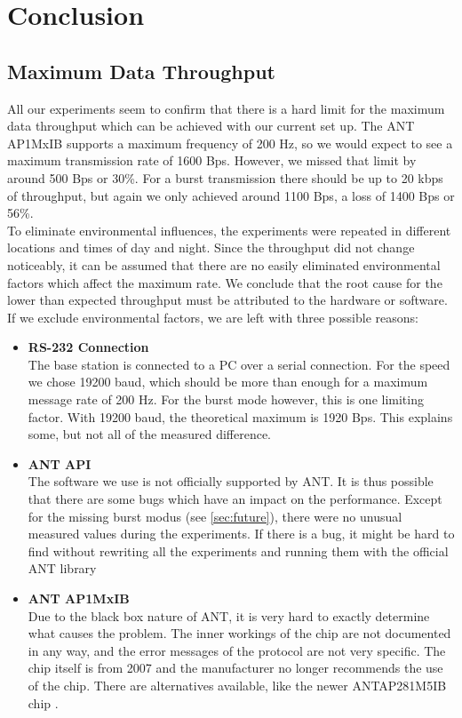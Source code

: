 \chapter{Conclusion}

\section{Maximum Data Throughput}
\label{sec:dataThrougput}

All our experiments seem to confirm that there is a hard limit for the maximum data throughput which can be achieved with our current set up. The ANT AP1MxIB supports a maximum frequency of 200 Hz, so we would expect to see a maximum transmission rate of 1600 Bps. However, we missed that limit by around 500 Bps or 30\%. For a burst transmission there should be up to 20 kbps of throughput, but again we only achieved around 1100 Bps, a loss of 1400 Bps or 56\%.\\
To eliminate environmental influences, the experiments were repeated in different locations and times of day and night. Since the throughput did not change noticeably, it can be assumed that there are no easily eliminated environmental factors which affect the maximum rate. We conclude that the root cause for the lower than expected throughput must be attributed to the hardware or software. \\

If we exclude environmental factors, we are left with three possible reasons:
\begin{itemize}
	\item{\textbf{RS-232 Connection}} \hfill \\ The base station is connected to a PC over a serial connection. For the speed we chose 19200 baud, which should be more than enough for a maximum message rate of 200 Hz. For the burst mode however, this is one limiting factor. With 19200 baud, the theoretical maximum is 1920 Bps. This explains some, but not all of the measured difference.
	
	\item{\textbf{ANT API}} \hfill \\ The software we use is not officially supported by ANT. It is thus possible that there are some bugs which have an impact on the performance. Except for the missing burst modus (see \ref{sec:future}), there were no unusual measured values during the experiments. If there is a bug, it might be hard to find without rewriting all the experiments and running them with the official ANT library \cite{ANTWinLib}
	
	\item{\textbf{ANT AP1MxIB}} \hfill \\ Due to the black box nature of ANT, it is very hard to exactly determine what causes the problem. The inner workings of the chip are not documented in any way, and the error messages of the protocol are not very specific. The chip itself is from 2007 and the manufacturer no longer recommends the use of the chip\cite{AP1page}. There are alternatives available, like the newer ANTAP281M5IB chip \cite{AP2Datasheet}.
\end{itemize}
\newpage
